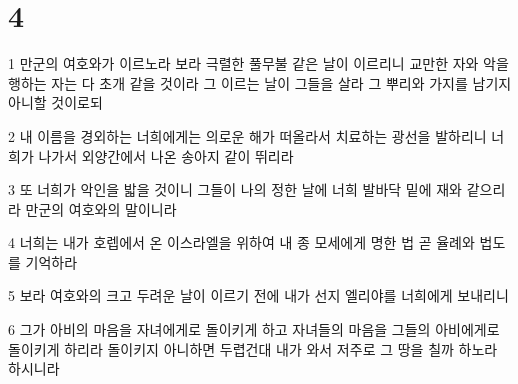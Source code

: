 \chapter{4}

\par 1 만군의 여호와가 이르노라 보라 극렬한 풀무불 같은 날이 이르리니 교만한 자와 악을 행하는 자는 다 초개 같을 것이라 그 이르는 날이 그들을 살라 그 뿌리와 가지를 남기지 아니할 것이로되
\par 2 내 이름을 경외하는 너희에게는 의로운 해가 떠올라서 치료하는 광선을 발하리니 너희가 나가서 외양간에서 나온 송아지 같이 뛰리라
\par 3 또 너희가 악인을 밟을 것이니 그들이 나의 정한 날에 너희 발바닥 밑에 재와 같으리라 만군의 여호와의 말이니라
\par 4 너희는 내가 호렙에서 온 이스라엘을 위하여 내 종 모세에게 명한 법 곧 율례와 법도를 기억하라
\par 5 보라 여호와의 크고 두려운 날이 이르기 전에 내가 선지 엘리야를 너희에게 보내리니
\par 6 그가 아비의 마음을 자녀에게로 돌이키게 하고 자녀들의 마음을 그들의 아비에게로 돌이키게 하리라 돌이키지 아니하면 두렵건대 내가 와서 저주로 그 땅을 칠까 하노라 하시니라


